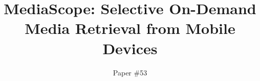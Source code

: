 \documentclass{sig-alternate-ipsn13}
\begin{document}
\title{MediaScope: Selective On-Demand Media Retrieval from Mobile Devices}
 \author{ Paper \#53
\vspace{-8pt}
}

\maketitle
\begin{abstract}

\end{abstract}
%


%
%





{
\footnotesize

}
\end{document}
